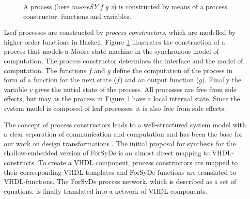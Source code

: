 \begin{figure}[htb]
  \centering
  \resizebox{\columnwidth}{!}{}
  \caption{A process (here \emph{mooreSY f g v}) is constructed by means of a process constructor, functions and variables.}
  \label{fig:ProcessConstructor}
\end{figure}


Leaf processes are constructed by \emph{process constructors}, which are modelled by higher-order functions in Haskell. Figure \ref{fig:ProcessConstructor} illustrates the construction of a process that models a Moore state machine in the synchronous model of computation. The process constructor determines the interface and the model of computation. The functions $f$ and $g$ define the computation of the process in form of a function for the next state ($f$) and an output function ($g$). Finally the variable $v$ gives the initial state of the process. All processes are free from side effects, but may as the process in Figure \ref{fig:ProcessConstructor} have a local internal state. Since the system model is composed of leaf processes, it is also free from side effects.

The concept of process constructors leads to a well-structured system model with a clear separation of communication and computation and has been the base for our work on design transformations \cite{SanJan2004a, RauSan2008a}. The initial proposal for synthesis for the shallow-embedded version of ForSyDe \cite{SanJan1999b} is an almost direct mapping  to VHDL-constructs. To create a VHDL component, process constructors are mapped to their corresponding VHDL templates and ForSyDe functions are translated to VHDL-functions. The ForSyDe process network, which is described as a set of equations, is finally translated into a network of VHDL components.  




